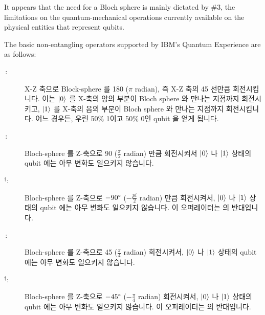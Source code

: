 It appears that the need for a Bloch sphere is mainly dictated by \#3,
the limitations on the quantum-mechanical operations currently available
on the physical entities that represent qubits.

The basic non-entangling operators supported by IBM's Quantum Experience
are as follows:
\fi

\begin{description}
\item[\,:]
	X-Z 축으로 Block-sphere 를 180\degree{} ($\pi$ radian), 즉 X-Z 축의
	45\degree{} 선만큼 회전시킵니다.  이는 $\ket{0}$ 를 X-축의 양의 부분이
	Bloch sphere 와 만나는 지점까지 회전시키고, $\ket{1}$ 를 X-축의 음의
	부분이 Bloch sphere 와 만나는 지점까지 회전시킵니다.
	어느 경우든, 우린 50\% 1이고 50\% 0인 qubit 을 얻게 됩니다.

\item[\,:]
	Bloch-sphere 를 Z-축으로 90\degree{} ($\frac{\pi}{2}$ radian) 만큼
	회전시켜서 $\ket{0}$ 나 $\ket{1}$ 상태의 qubit 에는 아무 변화도
	일으키지 않습니다.

\item[$^{\bm{\dagger}}$:]
	Bloch-sphere 를 Z-축으로 $-90\degree$ ($-\frac{pi}{2}$ radian) 만큼
	회전시켜서, $\ket{0}$ 나 $\ket{1}$ 상태의 qubit 에는 아무 변화도
	일으키지 않습니다.
	이 오퍼레이터는  의 반대입니다.

\item[\,:]
	Bloch-sphere 를 Z-축으로 45\degree{} ($\frac{\pi}{4}$ radian)
	회전시켜서, $\ket{0}$ 나 $\ket{1}$ 상태의 qubit 에는 아무 변화도
	일으키지 않습니다.

\item[$^{\bm{\dagger}}$:]
	Bloch-sphere 를 Z-축으로 $-45\degree{}$ ($-\frac{\pi}{4}$ radian)
	회전시켜서, $\ket{0}$ 나 $\ket{1}$ 상태의 qubit 에는 아무 변화도
	일으키지 않습니다.
	이 오퍼레이터는  의 반대입니다.
	\iffalse


\end{description}
